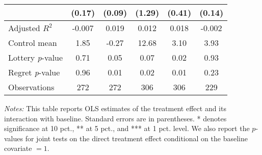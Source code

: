 \begin{table}[htbp]
{\begin{threeparttable}
\begin{tabular}{l*{5}{c}}
                &   (0.17)         &   (0.09)         &   (1.29)         &   (0.41)         &   (0.14)         \\
\midrule
Adjusted \(R^{2}\)&   -0.007         &    0.019         &    0.012         &    0.018         &   -0.002         \\
Control mean    &     1.85         &    -0.27         &    12.68         &     3.10         &     3.93         \\
Lottery \emph{p}-value&     0.71         &     0.05         &     0.07         &     0.02         &     0.93         \\
Regret \emph{p}-value&     0.96         &     0.01         &     0.02         &     0.01         &     0.23         \\
Observations    &      272         &      272         &      306         &      306         &      229         \\
\bottomrule \end{tabular} \begin{tablenotes}[flushleft] \footnotesize \item \emph{Notes:} This table reports OLS estimates of the treatment effect and its interaction with baseline. Standard errors are in parentheses. * denotes significance at 10 pct., ** at 5 pct., and *** at 1 pct. level. We also report the \(p\)-values for joint tests on the direct treatment effect conditional on the baseline covariate $= 1$. \end{tablenotes} \end{threeparttable} } \end{table}
